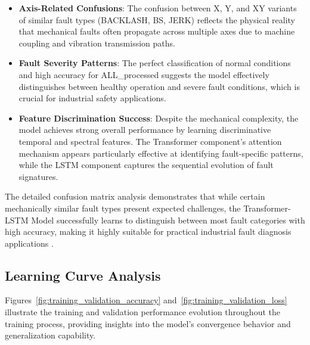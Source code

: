 \begin{itemize}
    \item \textbf{Axis-Related Confusions}: The confusion between X, Y, and XY variants of similar fault types (BACKLASH, BS, JERK) reflects the physical reality that mechanical faults often propagate across multiple axes due to machine coupling and vibration transmission paths.
    
    \item \textbf{Fault Severity Patterns}: The perfect classification of normal conditions and high accuracy for ALL\_processed suggests the model effectively distinguishes between healthy operation and severe fault conditions, which is crucial for industrial safety applications.
    
    \item \textbf{Feature Discrimination Success}: Despite the mechanical complexity, the model achieves strong overall performance by learning discriminative temporal and spectral features. The Transformer component's attention mechanism appears particularly effective at identifying fault-specific patterns, while the LSTM component captures the sequential evolution of fault signatures.
\end{itemize}

The detailed confusion matrix analysis demonstrates that while certain mechanically similar fault types present expected challenges, the Transformer-LSTM Model successfully learns to distinguish between most fault categories with high accuracy, making it highly suitable for practical industrial fault diagnosis applications \citep{he2009learning}.

\subsection{Learning Curve Analysis}
\label{subsec:learning_curve_analysis}

Figures~\ref{fig:training_validation_accuracy} and~\ref{fig:training_validation_loss} illustrate the training and validation performance evolution throughout the training process, providing insights into the model's convergence behavior and generalization capability.

